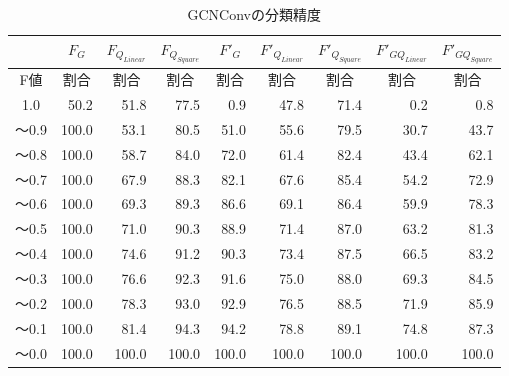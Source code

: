 \begin{table*}[tb]
\caption{GCNConvの分類精度}\label{tbl:result_gcnconv}
\centering
\begin{tabular}{|c|r|r|r|r|r|r|r|r|}\hline
  & \multicolumn{1}{|c|}{$F_{G}$} & \multicolumn{1}{|c|}{$F_{Q_{Linear}}$} & \multicolumn{1}{|c|}{$F_{Q_{Square}}$} & \multicolumn{1}{|c|}{$F'_{G}$} & \multicolumn{1}{|c|}{${F'}_{Q_{Linear}}$} & \multicolumn{1}{|c|}{${F'}_{Q_{Square}}$} & \multicolumn{1}{|c|}{${F'}_{GQ_{Linear}}$} & \multicolumn{1}{|c|}{${F'}_{GQ_{Square}}$}\\
  \hline
  \multicolumn{1}{|c|}{F値} & \multicolumn{1}{|c|}{割合} & \multicolumn{1}{|c|}{割合} & \multicolumn{1}{|c|}{割合} & \multicolumn{1}{|c|}{割合} & \multicolumn{1}{|c|}{割合} & \multicolumn{1}{|c|}{割合} & \multicolumn{1}{|c|}{割合} & \multicolumn{1}{|c|}{割合} \\
  \hline
  1.0   & 50.2 & 51.8 & 77.5 & 0.9 & 47.8 & 71.4 & 0.2 & 0.8 \\
  〜0.9 & 100.0 & 53.1 & 80.5 & 51.0 & 55.6 & 79.5 & 30.7 & 43.7 \\
  〜0.8 & 100.0 & 58.7 & 84.0 & 72.0 & 61.4 & 82.4 & 43.4 & 62.1 \\
  〜0.7 & 100.0 & 67.9 & 88.3 & 82.1 & 67.6 & 85.4 & 54.2 & 72.9 \\
  〜0.6 & 100.0 & 69.3 & 89.3 & 86.6 & 69.1 & 86.4 & 59.9 & 78.3 \\
  〜0.5 & 100.0 & 71.0 & 90.3 & 88.9 & 71.4 & 87.0 & 63.2 & 81.3 \\
  〜0.4 & 100.0 & 74.6 & 91.2 & 90.3 & 73.4 & 87.5 & 66.5 & 83.2 \\
  〜0.3 & 100.0 & 76.6 & 92.3 & 91.6 & 75.0 & 88.0 & 69.3 & 84.5 \\
  〜0.2 & 100.0 & 78.3 & 93.0 & 92.9 & 76.5 & 88.5 & 71.9 & 85.9 \\
  〜0.1 & 100.0 & 81.4 & 94.3 & 94.2 & 78.8 & 89.1 & 74.8 & 87.3 \\
  〜0.0 & 100.0 & 100.0 & 100.0 & 100.0 & 100.0 & 100.0 & 100.0 & 100.0 \\
  \hline
\end{tabular}
\end{table*}

